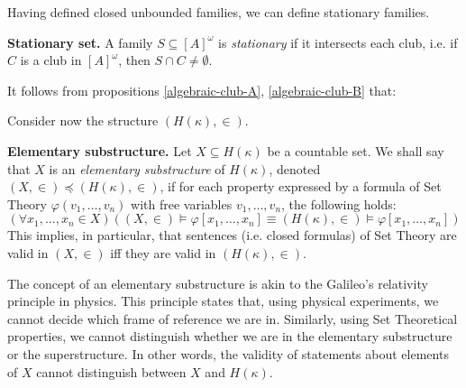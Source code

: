 Having defined closed unbounded families, we can define stationary families.

\begin{definition}\label{stationary}
{\bf Stationary set.} A family $S\subseteq [A]^{\omega}$ is \emph{stationary} if it intersects each club,
i.e. if $C$ is a club in $[A]^{\omega}$, then $S\cap C\neq\emptyset$.
\end{definition}

It follows from propositions \ref{algebraic-club-A}, \ref{algebraic-club-B} that:


Consider now the structure $(H(\kappa),\in)$.

\begin{definition}\label{elementary-substructure}
{\bf Elementary substructure.}
Let $X\subseteq H(\kappa)$ be a countable set. We shall say that
$X$ is an \emph{elementary substructure} of $H(\kappa)$, denoted $(X,\in)\preceq (H(\kappa),\in)$, if for each property expressed
by a formula of Set Theory $\varphi(v_1,\ldots,v_n)$ with free variables $v_1,\ldots, v_n$, the following holds:
$$ %
(\forall x_1,\ldots,x_n\in X)( (X,\in)\models \varphi[x_1,\ldots,x_n] \equiv (H(\kappa),\in)\models \varphi[x_1,\ldots,x_n] )
$$ %
This implies, in particular, that sentences (i.e. closed formulas) of Set Theory are valid in $(X,\in)$ iff they are valid in $(H(\kappa),\in)$.
\end{definition}

The concept of an elementary substructure is akin to the Galileo's relativity principle in physics. This principle states that, using physical
experiments, we cannot decide which frame of reference we are in. Similarly, using Set Theoretical properties, we cannot distinguish
whether we are in the elementary substructure or the superstructure. In other words, the validity of statements about elements of $X$
cannot distinguish between $X$ and $H(\kappa)$.



